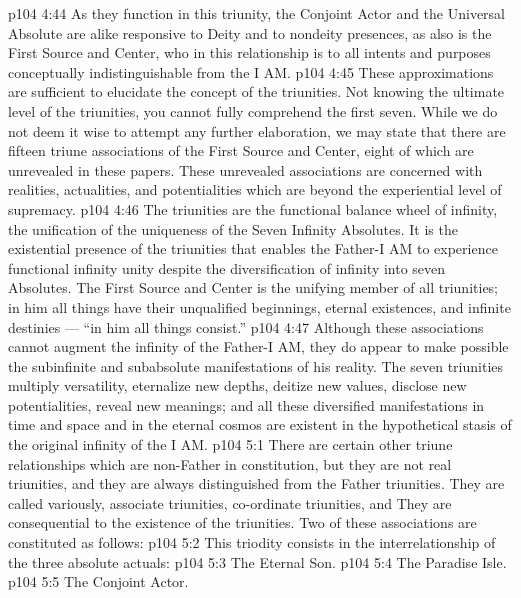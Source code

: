 \vs p104 4:44 As they function in this triunity, the Conjoint Actor and the Universal Absolute are alike responsive to Deity and to nondeity presences, as also is the First Source and Center, who in this relationship is to all intents and purposes conceptually indistinguishable from the I AM.
\vs p104 4:45 \pc These approximations are sufficient to elucidate the concept of the triunities. Not knowing the ultimate level of the triunities, you cannot fully comprehend the first seven. While we do not deem it wise to attempt any further elaboration, we may state that there are fifteen triune associations of the First Source and Center, eight of which are unrevealed in these papers. These unrevealed associations are concerned with realities, actualities, and potentialities which are beyond the experiential level of supremacy.
\vs p104 4:46 The triunities are the functional balance wheel of infinity, the unification of the uniqueness of the Seven Infinity Absolutes. It is the existential presence of the triunities that enables the Father\hyp{}I AM to experience functional infinity unity despite the diversification of infinity into seven Absolutes. The First Source and Center is the unifying member of all triunities; in him all things have their unqualified beginnings, eternal existences, and infinite destinies --- “in him all things consist.”
\vs p104 4:47 Although these associations cannot augment the infinity of the Father\hyp{}I AM, they do appear to make possible the subinfinite and subabsolute manifestations of his reality. The seven triunities multiply versatility, eternalize new depths, deitize new values, disclose new potentialities, reveal new meanings; and all these diversified manifestations in time and space and in the eternal cosmos are existent in the hypothetical stasis of the original infinity of the I AM.
\vs p104 5:1 There are certain other triune relationships which are non\hyp{}Father in constitution, but they are not real triunities, and they are always distinguished from the Father triunities. They are called variously, associate triunities, co\hyp{}ordinate triunities, and  They are consequential to the existence of the triunities. Two of these associations are constituted as follows:
\vs p104 5:2  This triodity consists in the interrelationship of the three absolute actuals:
\vs p104 5:3 \bibnobreakspace The Eternal Son.
\vs p104 5:4 \bibnobreakspace The Paradise Isle.
\vs p104 5:5 \bibnobreakspace The Conjoint Actor.
